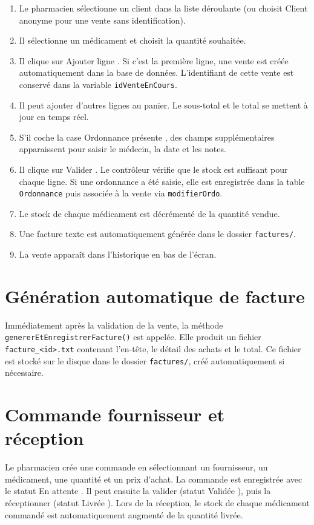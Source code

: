 \documentclass[12pt,a4paper]{report}
\begin{document}
\begin{enumerate}[nosep]
  \item Le pharmacien sélectionne un client dans la liste déroulante (ou choisit \og Client anonyme \fg{} pour une vente sans identification).
  \item Il sélectionne un médicament et choisit la quantité souhaitée.
  \item Il clique sur \og Ajouter ligne \fg. Si c'est la première ligne, une vente est créée automatiquement dans la base de données. L'identifiant de cette vente est conservé dans la variable \texttt{idVenteEnCours}.
  \item Il peut ajouter d'autres lignes au panier. Le sous-total et le total se mettent à jour en temps réel.
  \item S'il coche la case \og Ordonnance présente \fg, des champs supplémentaires apparaissent pour saisir le médecin, la date et les notes.
  \item Il clique sur \og Valider \fg. Le contrôleur vérifie que le stock est suffisant pour chaque ligne. Si une ordonnance a été saisie, elle est enregistrée dans la table \texttt{Ordonnance} puis associée à la vente via \texttt{modifierOrdo}.
  \item Le stock de chaque médicament est décrémenté de la quantité vendue.
  \item Une facture texte est automatiquement générée dans le dossier \texttt{factures/}.
  \item La vente apparaît dans l'historique en bas de l'écran.
\end{enumerate}

\section{Génération automatique de facture}

Immédiatement après la validation de la vente, la méthode \texttt{genererEtEnregistrerFacture()} est appelée. Elle produit un fichier \texttt{facture\_<id>.txt} contenant l'en-tête, le détail des achats et le total. Ce fichier est stocké sur le disque dans le dossier \texttt{factures/}, créé automatiquement si nécessaire.

\section{Commande fournisseur et réception}

Le pharmacien crée une commande en sélectionnant un fournisseur, un médicament, une quantité et un prix d'achat. La commande est enregistrée avec le statut \og En attente \fg. Il peut ensuite la valider (statut \og Validée \fg), puis la réceptionner (statut \og Livrée \fg). Lors de la réception, le stock de chaque médicament commandé est automatiquement augmenté de la quantité livrée.
\end{document}
